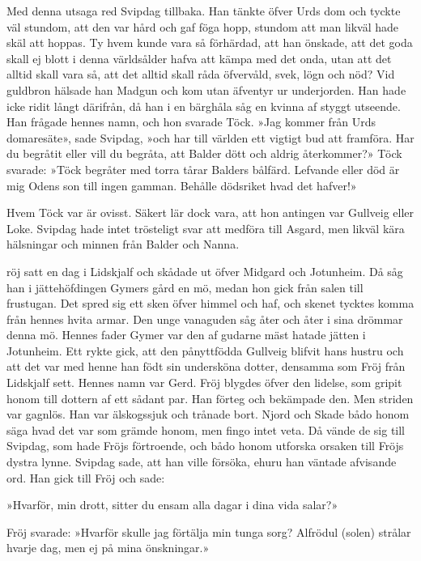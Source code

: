 Med denna utsaga red Svipdag tillbaka. Han tänkte öfver Urds dom och
tyckte väl stundom, att den var hård och gaf föga hopp, stundom att man
likväl hade skäl att hoppas. Ty hvem kunde vara så förhärdad, att han
önskade, att det goda skall ej blott i denna världsålder hafva att kämpa
med det onda, utan att det alltid skall vara så, att det alltid skall
råda öfvervåld, svek, lögn och nöd? Vid guldbron hälsade han Madgun och
kom utan äfventyr ur underjorden. Han hade icke ridit långt därifrån, då
han i en bärghåla såg en kvinna af styggt utseende. Han frågade hennes
namn, och hon svarade Töck. »Jag kommer från Urds domaresäte», sade
Svipdag, »och har till världen ett vigtigt bud att framföra. Har du
begråtit eller vill du begråta, att Balder dött och aldrig återkommer?»
Töck svarade: »Töck begråter med torra tårar Balders bålfärd. Lefvande
eller död är mig Odens son till ingen gamman. Behålle dödsriket hvad det
hafver!»

Hvem Töck var är ovisst. Säkert lär dock vara, att hon antingen var
Gullveig eller Loke. Svipdag hade intet trösteligt svar att medföra till
Asgard, men likväl kära hälsningar och minnen från Balder och Nanna.

\endSecII


\dropcapF röj satt en dag i Lidskjalf och skådade ut öfver Midgard och Jotunheim.
Då såg han i jättehöfdingen Gymers gård en mö, medan hon gick från salen
till frustugan. Det spred sig ett sken öfver himmel och haf, och skenet
tycktes komma från hennes hvita armar. Den unge vanaguden såg åter och
åter i sina drömmar denna mö. Hennes fader Gymer var den af gudarne mäst
hatade jätten i Jotunheim. Ett rykte gick, att den pånyttfödda Gullveig
blifvit hans hustru och att det var med henne han födt sin undersköna
dotter, densamma som Fröj från Lidskjalf sett. Hennes namn var Gerd.
Fröj
blygdes öfver den lidelse, som gripit honom till dottern af ett sådant
par. Han förteg och bekämpade den. Men striden var gagnlös. Han var
älskogssjuk och trånade bort. Njord och Skade bådo honom säga hvad det
var som grämde honom, men fingo intet veta. Då vände de sig till
Svipdag, som hade Fröjs förtroende, och bådo honom utforska orsaken till
Fröjs dystra lynne. Svipdag sade, att han ville försöka, ehuru han
väntade afvisande ord. Han gick till Fröj och sade:

»Hvarför, min drott, sitter du ensam alla dagar i dina vida salar?»

Fröj svarade: »Hvarför skulle jag förtälja min tunga sorg? Alfrödul
(solen) strålar hvarje dag, men ej på mina önskningar.»

